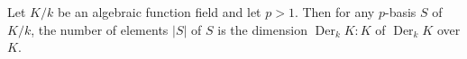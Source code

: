 Let $K/k$ be an algebraic function field and let $p > 1$. Then for any $p$-basis $S$ of $K/k$, the number of elements $|S|$ of $S$ is the dimension $\operatorname{Der}_k K : K$ of $\operatorname{Der}_k K$ over $K$.
